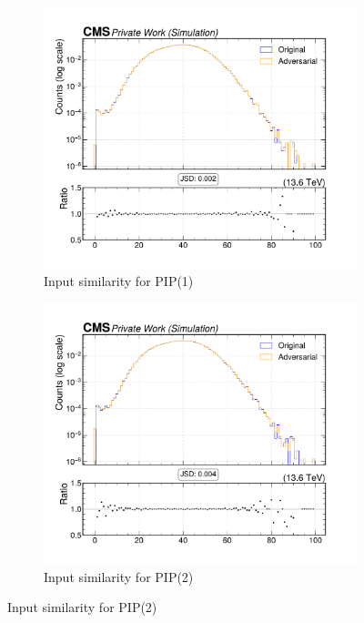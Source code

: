 \begin{figure}[htbp]
  \centering
  \begin{subfigure}[t]{0.5\textwidth}
    \includegraphics[width=\linewidth]{media/output/features/compare/intprob_1/cmp_global_features_npv.pdf}
    \caption{Input similarity for PIP(1)}
    \label{fig:left}
  \end{subfigure}\hfill
  \begin{subfigure}[t]{0.5\textwidth}
    \includegraphics[width=\linewidth]{media/output/features/compare/intprob_2/cmp_global_features_npv.pdf}
    \caption{Input similarity for PIP(2)}
  \end{subfigure}\hfill


\end{figure}
